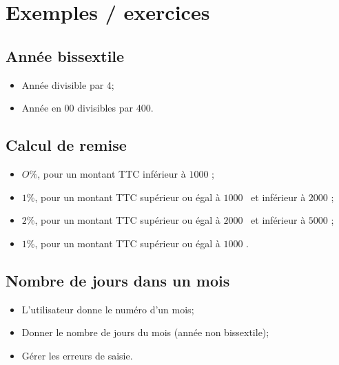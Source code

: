 \documentclass[12pt,a4paper]{article}
\begin{document}
\newpage
	\section{Exemples / exercices}
	
		\subsection{Année bissextile}
		
		\begin{itemize}
			\item Année divisible par 4;
			\item Année en 00 divisibles par 400.
		\end{itemize}
	
		\subsection{Calcul de remise}
		
		\begin{itemize}
			\item $O \%$, pour un montant TTC inférieur à $1000$ \officialeuro ;
			\item $1 \%$, pour un montant TTC supérieur ou égal à $1000$ \officialeuro\ et inférieur à $2000$ \officialeuro ;
			\item $2 \%$, pour un montant TTC supérieur ou égal à $2000$ \officialeuro\ et inférieur à $5000$ \officialeuro ;
			\item $1 \%$, pour un montant TTC supérieur ou égal à $1000$ \officialeuro .
		\end{itemize}
	
		\subsection{Nombre de jours dans un mois}
		
		\begin{itemize}
			\item L'utilisateur donne le numéro d'un mois;
			\item Donner le nombre de jours du mois (année non bissextile);
			\item Gérer les erreurs de saisie.
		\end{itemize}
\end{document}
